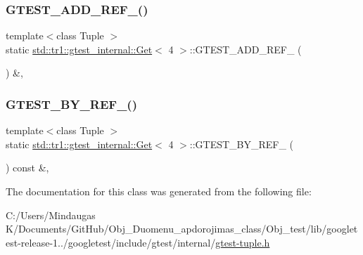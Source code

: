 \subsubsection{\texorpdfstring{GTEST\_ADD\_REF\_()}{GTEST\_ADD\_REF\_()}}
{\footnotesize\ttfamily template$<$class Tuple $>$ \\
static \mbox{\hyperlink{classstd_1_1tr1_1_1gtest__internal_1_1_get}{std\+::tr1\+::gtest\+\_\+internal\+::\+Get}}$<$ 4 $>$\+::G\+T\+E\+S\+T\+\_\+\+A\+D\+D\+\_\+\+R\+E\+F\+\_\+ (\begin{DoxyParamCaption}\item[{\mbox{\hyperlink{gtest-tuple_8h_a1b7f133d8aa02e0b7afed7b66781eeb7}{G\+T\+E\+S\+T\+\_\+\+T\+U\+P\+L\+E\+\_\+\+E\+L\+E\+M\+E\+N\+T\+\_\+}}(4, Tuple)}]{ }\end{DoxyParamCaption}) \&\hspace{0.3cm}{\ttfamily [inline]}, {\ttfamily [static]}}

\mbox{\label{classstd_1_1tr1_1_1gtest__internal_1_1_get_3_014_01_4_a04794c398bbe81e4de0915b79da2166a}} 
\subsubsection{\texorpdfstring{GTEST\_BY\_REF\_()}{GTEST\_BY\_REF\_()}}
{\footnotesize\ttfamily template$<$class Tuple $>$ \\
static \mbox{\hyperlink{classstd_1_1tr1_1_1gtest__internal_1_1_get}{std\+::tr1\+::gtest\+\_\+internal\+::\+Get}}$<$ 4 $>$\+::G\+T\+E\+S\+T\+\_\+\+B\+Y\+\_\+\+R\+E\+F\+\_\+ (\begin{DoxyParamCaption}\item[{\mbox{\hyperlink{gtest-tuple_8h_a1b7f133d8aa02e0b7afed7b66781eeb7}{G\+T\+E\+S\+T\+\_\+\+T\+U\+P\+L\+E\+\_\+\+E\+L\+E\+M\+E\+N\+T\+\_\+}}(4, Tuple)}]{ }\end{DoxyParamCaption}) const \&\hspace{0.3cm}{\ttfamily [inline]}, {\ttfamily [static]}}



The documentation for this class was generated from the following file\+:\begin{DoxyCompactItemize}
\item 
C\+:/\+Users/\+Mindaugas K/\+Documents/\+Git\+Hub/\+Obj\+\_\+\+Duomenu\+\_\+apdorojimas\+\_\+class/\+Obj\+\_\+test/lib/googletest-\/release-\/1../googletest/include/gtest/internal/\mbox{\hyperlink{gtest-tuple_8h}{gtest-\/tuple.\+h}}\end{DoxyCompactItemize}
